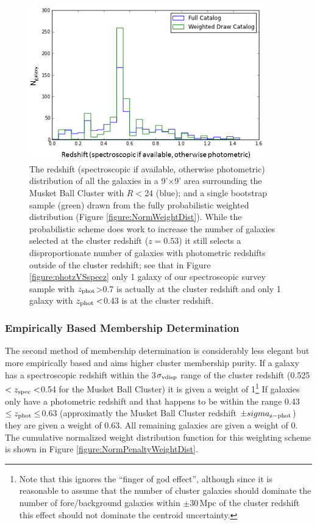 \begin{figure}
\centering
\includegraphics[width=4in]{Chapter4/AnalysisFiles/zdist_randomweightdraw_reformat.png}
\caption[Comparison of parent galaxy redshift distribution with weighted random draw distribution.]{
The redshift (spectroscopic if available, otherwise photometric) distribution of all the galaxies in a 9'$\times$9' area surrounding the Musket Ball Cluster with $R<$24 (blue); and a single bootstrap sample (green) drawn from the fully probabilistic weighted distribution (Figure \ref{figure:NormWeightDist}).
While the probabilistic scheme does work to increase the number of galaxies selected at the cluster redshift ($z=0.53$) it still selects a disproportionate number of galaxies with photometric redshifts outside of the cluster redshift; see that in Figure \ref{figure:photzVSspecz} only 1 galaxy of our spectroscopic survey sample with $z_{\rm phot}$>0.7 is actually at the cluster redshift and only 1 galaxy with $z_{\rm phot}<$0.43 is at the cluster redshift.
}
\label{figure:ProbWeightDist}
\end{figure}


\subsubsection{Empirically Based Membership Determination}\label{section:EmpiricalWeightScheme}

The second method of membership determination is considerably less elegant but more empirically based and aims higher cluster membership purity.
If a galaxy has a spectroscopic redshift within the 3$\sigma_{\rm vdisp}$ range of the cluster redshift (0.525$<z_{\rm spec}<$0.54 for the Musket Ball Cluster) it is given a weight of 1\footnote{
Note that this ignores the ``finger of god effect'', although since it is reasonable to assume that the number of cluster galaxies should dominate the number of fore/background galaxies within $\pm$30\,Mpc of the cluster redshift this effect should not dominate the centroid uncertainty.}
If galaxies only have a photometric redshift and that happens to be within the range 0.43$\leq z_{\rm phot} \leq$0.63 (approximatly the Musket Ball Cluster redshift $\pm sigma_{\rm z-phot}$) they are given a weight of 0.63.
All remaining galaxies are given a weight of 0.
The cumulative normalized weight distribution function for this weighting scheme is shown in Figure \ref{figure:NormPenaltyWeightDist}.

